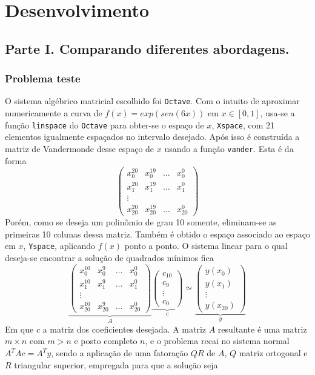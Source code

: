 \documentclass[a4paper, 12pt]{article}
\begin{document}
\section{Desenvolvimento}
\subsection{Parte I. Comparando diferentes abordagens.}
\subsubsection{Problema teste}
O sistema algébrico matricial escolhido foi \verb+Octave+. Com o intuito de aproximar numericamente a curva de $f(x)=exp(sen(6x))$ em $x\in[0,1]$, usa-se a função \verb+linspace+ do \verb+Octave+ para obter-se o espaço de $x$, \verb+Xspace+, com 21 elementos igualmente espaçados no intervalo desejado. Após isso é construída a matriz de Vandermonde desse espaço de $x$  usando a função \verb+vander+. Esta é da forma
\[
\begin{pmatrix}
x_0^{20}&x_0^{19}&\hdots&x_0^0\\
x_1^{20}&x_1^{19}&\hdots&x_1^0\\
\vdots \\
x_{20}^{20}&x_{20}^{19}&\hdots&x_{20}^0
\end{pmatrix}
\]
Porém, como se deseja um polinômio de grau 10 somente, eliminam-se as primeiras 10 colunas dessa matriz. Também é obtido o espaço associado ao espaço em $x$, \verb+Yspace+, aplicando $f(x)$ ponto a ponto. O sistema linear para o qual deseja-se encontrar a solução de quadrados mínimos fica
\[
\underbrace{
\begin{pmatrix}
x_0^{10}&x_0^9&\hdots&x_0^0\\
x_1^{10}&x_1^9&\hdots&x_1^0\\
\vdots \\
x_{20}^{10}&x_{20}^9&\hdots&x_{20}^0
\end{pmatrix}}_A
\underbrace{
\begin{pmatrix}
c_{10}\\
c_9\\
\vdots \\
c_0
\end{pmatrix}}_c
\simeq
\underbrace{
\begin{pmatrix}
y(x_0)\\
y(x_1)\\
\vdots \\
y(x_{20})
\end{pmatrix}}_y
\]
Em que $c$ a matriz dos coeficientes desejada. A matriz $A$ resultante é uma matriz  $m\times n$ com $m>n$ e posto completo $n$, e o problema recai no sistema normal $A^TAc=A^Ty$, sendo a aplicação de uma fatoração $QR$ de $A$, $Q$ matriz ortogonal e $R$ triangular superior, empregada para que a solução seja
\end{document}
